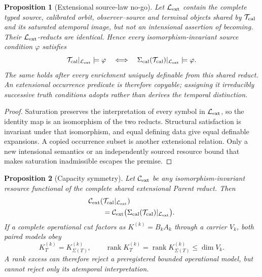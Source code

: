 \documentclass[11pt]{article}
\newtheorem{proposition}{Proposition}
\begin{document}
\begin{proposition}[Extensional source-law no-go]
Let \(\mathcal L_{\rm ext}\) contain the complete typed source, calibrated
orbit, observer--source and terminal objects shared by
\(\mathcal T_{\rm cal}\) and its saturated atemporal image, but not an
intensional assertion of becoming.  Their
\(\mathcal L_{\rm ext}\)-reducts are identical.  Hence every
isomorphism-invariant source condition \(\varphi\) satisfies
\begin{equation}
 \mathcal T_{\rm cal}|_{\mathcal L_{\rm ext}}\models\varphi
 \quad\Longleftrightarrow\quad
 \Sigma_{\rm cal}(\mathcal T_{\rm cal})|_{\mathcal L_{\rm ext}}
 \models\varphi.
 \label{eq:extensional-source-law-no-go}
\end{equation}
The same holds after every enrichment uniquely definable from this shared
reduct.  An extensional occurrence predicate is therefore copyable; assigning
it irreducibly successive truth conditions adopts rather than derives the
temporal distinction.
\end{proposition}

\begin{proof}
Saturation preserves the interpretation of every symbol in
\(\mathcal L_{\rm ext}\), so the identity map is an isomorphism of the two
reducts.  Structural satisfaction is invariant under that isomorphism, and
equal defining data give equal definable expansions.  A copied occurrence
subset is another extensional relation.  Only a new intensional semantics or
an independently sourced resource bound that makes saturation inadmissible
escapes the premise.
\end{proof}

\begin{proposition}[Capacity symmetry]
Let \(\mathcal C_{\rm ext}\) be any isomorphism-invariant resource
functional of the complete shared extensional Parent reduct.  Then
\begin{equation}
 \begin{aligned}
 &\mathcal C_{\rm ext}
   (\mathcal T_{\rm cal}|_{\mathcal L_{\rm ext}})\\
 &\qquad =
 \mathcal C_{\rm ext}
 \bigl(\Sigma_{\rm cal}(\mathcal T_{\rm cal})
       |_{\mathcal L_{\rm ext}}\bigr).
 \end{aligned}
 \label{eq:capacity-saturation-equality}
\end{equation}
If a complete operational cut factors as
\(K^{(k)}=B_kA_k\) through a carrier \(V_k\), both paired models obey
\begin{equation}
 K_T^{(k)}=K_{\Sigma(T)}^{(k)},\qquad
 \operatorname{rank}K_T^{(k)}
 =\operatorname{rank}K_{\Sigma(T)}^{(k)}
 \leq \dim V_k .
 \label{eq:paired-cut-rank}
\end{equation}
A rank excess can therefore reject a preregistered bounded operational model,
but cannot reject only its atemporal interpretation.
\end{proposition}
\end{document}
